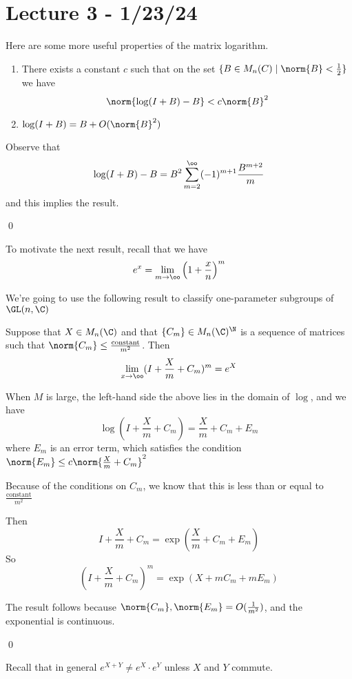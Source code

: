 \documentclass[x11names,reqno,14pt]{extarticle}
\begin{document}
\section*{Lecture 3 - 1/23/24}

Here are some more useful properties of the matrix logarithm. 

\begin{enumerate}

\item There exists a constant $c$ such that on the set $\{ B \in M_n(C) \mid \norm{B} <\frac12\}$ we have
\[
\norm{\log(I + B) - B} < c\norm{B}^2
\]

\item $\log(I + B) = B + O(\norm{B}^2)$

\end{enumerate}

\proof

Observe that 
\[
\log(I + B) - B = B^2\sum_{m=2}^\oo(-1)^{m+1}\frac{B^{m+2}}{m}
\]
and this implies the result. 

\qed

To motivate the next result, recall that we have 
\[
e^x = \lim_{m\to\oo}\left(1 + \frac{x}{n}\right)^m
\]

We're going to use the following result to classify one-parameter subgroups of $\GL(n,\C)$

\prop

Suppose that $X \in M_n(\C)$ and that $\{C_m\}\in M_n(\C)^\N$ is a sequence of matrices such that $\norm{C_m} \leq \frac{\text{constant}}{m^2}$. Then 
\[
\lim_{x\to\oo}(I + \frac{X}{m} + C_m)^m = e^X
\]

\proof

When $M$ is large, the left-hand side the above lies in the domain of $\log$, and we have 
\[
\log(I + \frac{X}{m} + C_m) = \frac{X}{m} + C_m + E_m
\]
where $E_m$ is an error term, which satisfies the condition $\norm{E_m}\leq c\norm{\frac{X}{m} + C_m}^2$

Because of the conditions on $C_m$, we know that this is less than or equal to $\frac{\text{constant}}{m^2}$

Then
\[
I + \frac{X}{m} + C_m = \exp\left(\frac{X}{m} + C_m + E_m\right)
\]
So
\[
\left(I + \frac{X}{m} + C_m\right)^m = \exp(X + mC_m + mE_m)
\]

The result follows because $\norm{C_m}, \norm{E_m} = O(\frac{1}{m^2})$, and the exponential is continuous. 

\qed

Recall that in general $e^{X + Y} \neq e^X\cdot e^Y$ unless $X$ and $Y$ commute. 
\end{document}

